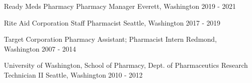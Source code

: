 

\begin{cventries}

  \cventry
    {Ready Meds Pharmacy} %
    {Pharmacy Manager} %
    {Everett, Washington} %
    {2019 - 2021} %
    {
    }

  \cventry
    {Rite Aid Corporation} %
    {Staff Pharmacist} %
    {Seattle, Washington} %
    {2017 - 2019} %
    {
    }

  \cventry
    {Target Corporation} %
    {Pharmacy Assistant; Pharmacist Intern} %
    {Redmond, Washington} %
    {2007 - 2014} %
    {
    }

  \cventry
    {University of Washington, School of Pharmacy, Dept. of Pharmaceutics} %
    {Research Technician II} %
    {Seattle, Washington} %
    {2010 - 2012} %
    {
    }

\end{cventries}
